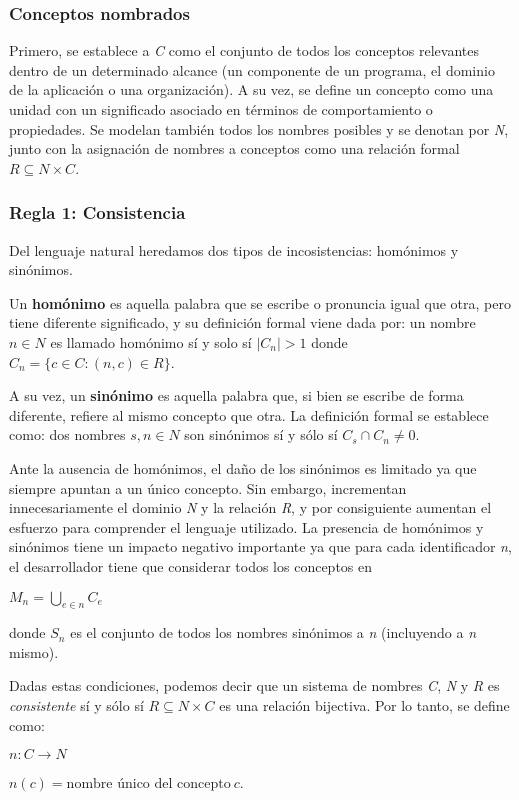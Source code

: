 \subsubsection{Conceptos nombrados}
Primero, se establece a \textit{C} como el conjunto de todos los conceptos relevantes dentro de un determinado alcance (un componente de un programa, el dominio de la aplicación o una organización). 
A su vez, se define un concepto como una unidad con un significado asociado en términos de comportamiento o propiedades. 
Se modelan también todos los nombres posibles y se denotan por \textit{N}, junto con la asignación de nombres a conceptos como una relación formal $R \subseteq N \times C$.

\subsubsection{Regla 1: Consistencia}
Del lenguaje natural heredamos dos tipos de incosistencias: homónimos y sinónimos.

Un \textbf{homónimo} es aquella palabra que se escribe o pronuncia igual que otra, pero tiene diferente significado, y su definición formal viene dada por: un nombre $n \in N$ es llamado homónimo sí y solo sí $|C_n| > 1$ donde $C_n = \{ c \in C : (n,c) \in R\}$.

A su vez, un \textbf{sinónimo} es aquella palabra que, si bien se escribe de forma diferente, refiere al mismo concepto que otra. 
La definición formal se establece como: dos nombres $s,n \in N$ son sinónimos sí y sólo sí $C_s \cap C_n \neq 0$.

Ante la ausencia de homónimos, el daño de los sinónimos es limitado ya que siempre apuntan a un único concepto. 
Sin embargo, incrementan innecesariamente el dominio \textit{N} y la relación \textit{R}, y por consiguiente aumentan el esfuerzo para comprender el lenguaje utilizado. 
La presencia de homónimos y sinónimos tiene un impacto negativo importante ya que para cada identificador \textit{n}, el desarrollador tiene que considerar todos los conceptos en
\begin{center}
  $M_n = \bigcup_{e \in n} C_e$
\end{center}
donde $S_n$ es el conjunto de todos los nombres sinónimos a \textit{n} (incluyendo a \textit{n} mismo).

Dadas estas condiciones, podemos decir que un sistema de nombres \textit{C}, \textit{N} y \textit{R} es \textit{consistente} sí y sólo sí $R \subseteq N \times C$ es una relación bijectiva. 
Por lo tanto, se define como:
\begin{center}
  $n : C \rightarrow N$
  
  $n(c) = \mbox{nombre único del concepto} \ c$.  
\end{center}

